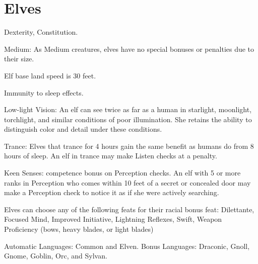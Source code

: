 \section{Elves}
\begin{itemize*}
\item {} Dexterity,  Constitution.
\item Medium: As Medium creatures, elves have no special bonuses or penalties due to their size.
\item Elf base land speed is 30 feet.
\item Immunity to sleep effects.
\item Low-light Vision: An elf can see twice as far as a human in starlight, moonlight, torchlight, and similar conditions of poor illumination. She retains the ability to distinguish color and detail under these conditions.
 \item Trance: Elves that trance for 4 hours gain the same benefit as humans do from 8 hours of sleep. An elf in trance may make Listen checks at a  penalty.
\item Keen Senses:  competence bonus on Perception checks. An elf with 5 or more ranks in Perception who comes within 10 feet of a secret or concealed door may make a Perception check to notice it as if she were actively searching. 
\item Elves can choose any of the following feats for their racial bonus feat: Dilettante, Focused Mind, Improved Initiative, Lightning Reflexes, Swift, Weapon Proficiency (bows, heavy blades, or light blades)
\item Automatic Languages: Common and Elven. Bonus Languages: Draconic, Gnoll, Gnome, Goblin, Orc, and Sylvan.
\end{itemize*}

